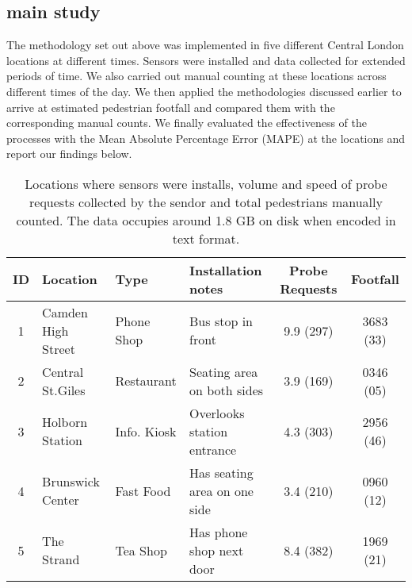 \subsection{main study}

The methodology set out above was implemented in five different Central London locations at different times. Sensors were installed and data collected for extended periods of time. We also carried out manual counting at these locations across different times of the day. We then applied the methodologies discussed earlier to arrive at estimated pedestrian footfall and compared them with the corresponding manual counts.  We finally evaluated the effectiveness of the processes with the Mean Absolute Percentage Error (MAPE) at the locations and report our findings below.  

\begin{table}
    \caption{Locations where sensors were installs, volume and speed of probe requests collected by
    the sendor and total pedestrians manually counted. The data occupies around 1.8 GB on disk 
    when encoded in text format.}
    {\begin{tabular}{cp{2cm}p{1.5cm}p{2cm}cc} 
		\toprule
         ID & Location & Type & Installation notes & Probe Requests & Footfall\\
		 \midrule
         1 & Camden High Street & Phone Shop & Bus stop in front & 9.9 (297) & 3683 (33)\\
         2 & Central St.Giles & Restaurant & Seating area on both sides & 3.9 (169) & 0346 (05)\\
         3 & Holborn Station & Info. Kiosk & Overlooks station entrance & 4.3 (303) & 2956 (46)\\
         4 & Brunswick Center & Fast Food & Has seating area on one side & 3.4 (210) & 0960 (12)\\
         5 & The Strand & Tea Shop & Has phone shop next door & 8.4 (382) & 1969 (21)\\
		 \bottomrule
	\end{tabular}}
	\label{locations-table}
\end{table}


